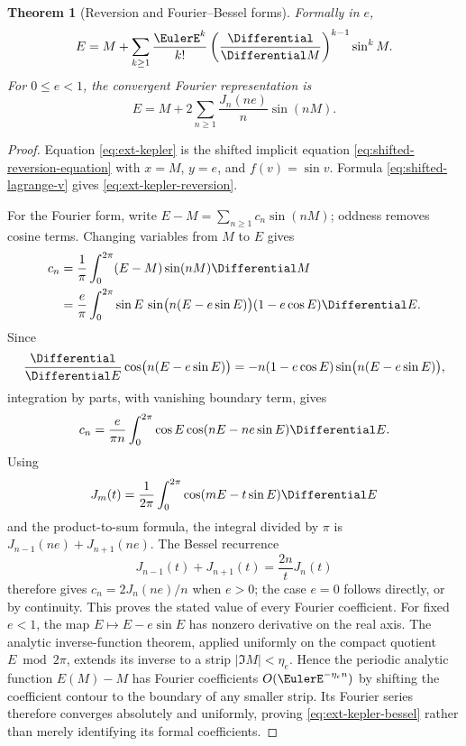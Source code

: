 \documentclass[11pt,a4paper,oneside,openany]{book}
\newtheorem{theorem}{Theorem}[chapter]
\theoremstyle{definition}
\theoremstyle{remark}
\begin{document}
\begin{theorem}[Reversion and Fourier--Bessel forms]
Formally in \(e\),
\begin{equation}\label{eq:ext-kepler-reversion}
 E=M+\sum_{k\ge1}\frac{\EulerE^k}{k!}
 \left(\frac{\Differential}{\Differential M}\right)^{k-1}\sin^kM.
\end{equation}
For \(0\le e<1\), the convergent Fourier representation is
\begin{equation}\label{eq:ext-kepler-bessel}
 E=M+2\sum_{n\ge1}\frac{J_n(ne)}{n}\sin(nM).
\end{equation}
\end{theorem}
\begin{proof}
Equation \eqref{eq:ext-kepler} is the shifted implicit equation
\eqref{eq:shifted-reversion-equation} with \(x=M\), \(y=e\), and
\(f(v)=\sin v\).  Formula \eqref{eq:shifted-lagrange-v} gives
\eqref{eq:ext-kepler-reversion}.

For the Fourier form, write
\(E-M=\sum_{n\ge1}c_n\sin(nM)\); oddness removes cosine terms.  Changing
variables from \(M\) to \(E\) gives
\begin{align*}
 c_n
 &=\frac1\pi\int_0^{2\pi}(E-M)\sin(nM)\Differential M\\
 &=\frac e\pi\int_0^{2\pi}\sin E\,
   \sin\bigl(n(E-e\sin E)\bigr)(1-e\cos E)\Differential E.
\end{align*}
Since
\[
 \frac{\Differential}{\Differential E}\cos\bigl(n(E-e\sin E)\bigr)
 =-n(1-e\cos E)\sin\bigl(n(E-e\sin E)\bigr),
\]
integration by parts, with vanishing boundary term, gives
\[
 c_n=\frac e{\pi n}\int_0^{2\pi}
 \cos E\cos(nE-ne\sin E)\Differential E.
\]
Using
\[
 J_m(t)=\frac1{2\pi}\int_0^{2\pi}\cos(mE-t\sin E)\Differential E
\]
and the product-to-sum formula, the integral divided by \(\pi\) is
\(J_{n-1}(ne)+J_{n+1}(ne)\).  The Bessel recurrence
\[
 J_{n-1}(t)+J_{n+1}(t)=\frac{2n}{t}J_n(t)
\]
therefore gives \(c_n=2J_n(ne)/n\) when \(e>0\); the case \(e=0\) follows
directly, or by continuity.  This proves the stated value of every Fourier
coefficient.  For fixed
\(e<1\), the map \(E\mapsto E-e\sin E\) has nonzero derivative on the real
axis.  The analytic inverse-function theorem, applied uniformly on the compact
quotient \(E\bmod 2\pi\), extends its inverse to a strip
\(|\Im M|<\eta_e\).  Hence the periodic analytic function \(E(M)-M\) has
Fourier coefficients \(O(\EulerE^{-\eta_e n})\) by shifting the coefficient contour
to the boundary of any smaller strip.  Its Fourier series therefore converges
absolutely and uniformly, proving \eqref{eq:ext-kepler-bessel} rather than
merely identifying its formal coefficients.
\end{proof}
\end{document}
